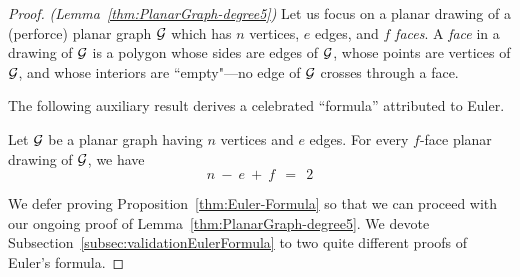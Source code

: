 \begin{proof} {\em (Lemma~\ref{thm:PlanarGraph-degree5})}
Let us focus on a planar drawing of a (perforce) planar graph $\mbox{$\cal G$}$ which has $n$ vertices, $e$ edges, and $f$ {\it faces}.  A {\it face} in a drawing of $\mbox{$\cal G$}$ is a polygon whose sides are edges of
$\mbox{$\cal G$}$, whose points are vertices of $\mbox{$\cal G$}$, and whose interiors are ``empty"---no edge of $\mbox{$\cal G$}$ crosses through a face.

\bigskip

\noindent {}
\bigskip

The following auxiliary result derives a celebrated ``formula'' attributed to Euler.

 

\begin{prop} 
\label{thm:Euler-Formula}
Let $\mbox{$\cal G$}$ be a planar graph having $n$ vertices and $e$ edges.  For every $f$-face planar drawing of $\mbox{$\cal G$}$, we have
\begin{equation}
\label{eqn:Eulers-formula}
n \ - \ e \ + \ f \ \ = \ \ 2
\end{equation}
\end{prop}

\medskip

We defer proving Proposition~\ref{thm:Euler-Formula} so that we can proceed with our ongoing proof of Lemma~\ref{thm:PlanarGraph-degree5}.  We devote Subsection~\ref{subsec:validationEulerFormula} to two quite different proofs of Euler's formula.

\medskip



\end{proof}
